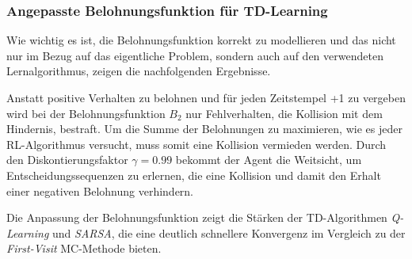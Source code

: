 \par 

\subsubsection*{Angepasste Belohnungsfunktion für TD-Learning}
Wie wichtig es ist, die Belohnungsfunktion korrekt zu modellieren und das nicht nur im Bezug auf das eigentliche Problem, sondern auch auf den verwendeten Lernalgorithmus, zeigen die nachfolgenden Ergebnisse.
\par 
Anstatt positive Verhalten zu belohnen und für jeden Zeitstempel +1 zu vergeben wird bei der Belohnungsfunktion $B_2$ nur Fehlverhalten, die Kollision mit dem Hindernis, bestraft. Um die Summe der Belohnungen zu maximieren, wie es jeder RL-Algorithmus versucht, muss somit eine Kollision vermieden werden. Durch den Diskontierungsfaktor $\gamma = 0.99$ bekommt der Agent die \glqq Weitsicht\grqq{}, um Entscheidungssequenzen zu erlernen, die eine Kollision und damit den Erhalt einer negativen Belohnung verhindern. 
\par 
Die Anpassung der Belohnungsfunktion zeigt die Stärken der TD-Algorithmen \textit{Q-Learning} und \textit{SARSA}, die eine deutlich schnellere Konvergenz im Vergleich zu der \textit{First-Visit} MC-Methode bieten.


